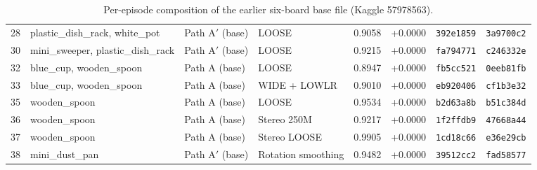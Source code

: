\documentclass[10pt]{nvidiaextabstract}
\begin{document}
\begin{table}[t]
{\begin{tabular}{@{}rlllrrll@{}}
    28 & plastic\_dish\_rack, white\_pot   & Path A$'$ (base) & LOOSE                & 0.9058 & +0.0000 & \texttt{392e1859} & \texttt{3a9700c2} \\
    30 & mini\_sweeper, plastic\_dish\_rack& Path A$'$ (base) & LOOSE                & 0.9215 & +0.0000 & \texttt{fa794771} & \texttt{c246332e} \\
    32 & blue\_cup, wooden\_spoon          & Path A (base)    & LOOSE                & 0.8947 & +0.0000 & \texttt{fb5cc521} & \texttt{0eeb81fb} \\
    33 & blue\_cup, wooden\_spoon          & Path A (base)    & WIDE + LOWLR         & 0.9010 & +0.0000 & \texttt{eb920406} & \texttt{cf1b3e32} \\
    35 & wooden\_spoon                     & Path A (base)    & LOOSE                & 0.9534 & +0.0000 & \texttt{b2d63a8b} & \texttt{b51c384d} \\
    36 & wooden\_spoon                     & Path A (base)    & Stereo 250M          & 0.9217 & +0.0000 & \texttt{1f2ffdb9} & \texttt{47668a44} \\
    37 & wooden\_spoon                     & Path A (base)    & Stereo LOOSE         & 0.9905 & +0.0000 & \texttt{1cd18c66} & \texttt{e36e29cb} \\
    38 & mini\_dust\_pan                   & Path A$'$ (base) & Rotation smoothing   & 0.9482 & +0.0000 & \texttt{39512cc2} & \texttt{fad58577} \\
    \bottomrule
  \end{tabular}}
  \caption{Per-episode composition of the earlier six-board base file (Kaggle 57978563).}
  \label{tab:provenance}
\end{table}
\end{document}

